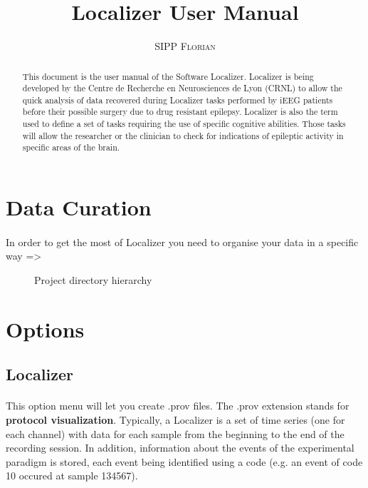 \documentclass[a4paper]{article}
\title{Localizer User Manual}
\author{\textsc{SIPP Florian}}
\begin{document}
\maketitle
\begin{abstract}
This document is the user manual of the Software Localizer. Localizer is being developed by the Centre de Recherche en Neurosciences de Lyon (CRNL) to allow the quick analysis of data recovered during Localizer tasks performed by iEEG patients before their possible surgery due to drug resistant epilepsy.  Localizer is also the term used to define a set of tasks requiring the use of specific cognitive abilities. Those tasks will allow the researcher or the clinician to check for indications of epileptic activity in specific areas of the brain. 
\end{abstract}
\tableofcontents
\section{Data Curation} \label{curation}    
\paragraph{} In order to get the most of Localizer you need to organise your data in a specific way => 
\begin{figure}[H]
\caption{\label{projectDirectory}Project directory hierarchy}
\end{figure}

\section{Options} \label{options}    
\subsection{Localizer}
\paragraph{} This option menu will let you create .prov files. The .prov extension stands for \textbf{protocol visualization}. Typically, a Localizer is a set of time series (one for each channel) with data for each sample from the beginning to the end of the recording session. In addition,  information about the events of the experimental paradigm is stored, each event being identified using a code (e.g. an event of code 10 occured at sample 134567).
\end{document}
